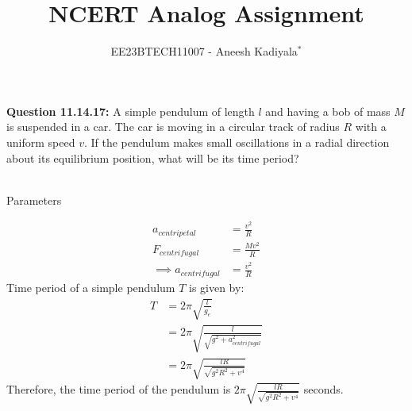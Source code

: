 \documentclass[journal,12pt,twocolumn]{IEEEtran}
\theoremstyle{remark}
\begin{document}

\vspace{3cm}

\title{NCERT Analog Assignment}
\author{EE23BTECH11007 - Aneesh Kadiyala$^{*}$%
}
\maketitle
\newpage
\bigskip

\renewcommand{\thefigure}{\theenumi}
\renewcommand{\thetable}{\theenumi}

\vspace{3cm}
\textbf{Question 11.14.17:} A simple pendulum of length $l$ and having a bob of mass $M$ is suspended in a car. The car is moving in a circular track of radius $R$ with a uniform speed $v$. If the pendulum makes small oscillations in a radial direction about its equilibrium position, what will be its time period?
\\
\solution
\\
\begin{table}
    \centering
    \caption{Parameters}
    \label{tab:1}
    
\end{table}

\begin{align}
a_{centripetal} &= \frac{v^2}{R} \\
F_{centrifugal} &= \frac{Mv^2}{R} \\
\implies a_{centrifugal} &= \frac{v^2}{R}
\end{align}
Time period of a simple pendulum $T$ is given by:
\begin{align}
T &= 2\pi\sqrt{\frac{l}{g_{e}}} \\
&= 2\pi\sqrt{\frac{l}{\sqrt{g^2 + a_{centrifugal}^2}}} \\
&= 2\pi\sqrt{\frac{lR}{\sqrt{g^2R^2 + v^4}}}
\end{align}
Therefore, the time period of the pendulum is $2\pi\sqrt{\frac{lR}{\sqrt{g^2R^2 + v^4}}}$ seconds.
\end{document}
